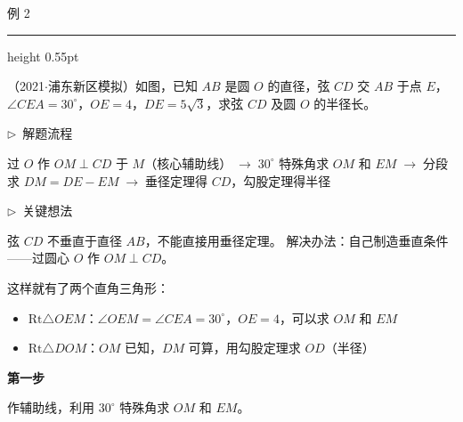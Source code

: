 \documentclass{exam-zh}
\newcommand{\edukai}{\kaishu}
\newenvironment{eduSubQuestionItem}[1]{%
  \needspace{4\baselineskip}%
  \vspace{2mm}
  \par\noindent
  \hangindent=8mm\hangafter=1
  {\color{edu-blue}\bfseries #1}\enspace
  \begingroup
  \color{edu-ink}
}{%
  \endgroup
  \par
  \vspace{3mm}
}
\newenvironment{eduAuxItem}[1]{%
  \needspace{4\baselineskip}%
  \vspace{2mm}
  \par\noindent
  \hangindent=8mm\hangafter=1
  {\color{edu-blue}\edukai $\triangleright$~#1}\enspace
  \begingroup
  \color{edu-ink}
  \edukai
}{%
  \endgroup
  \par
  \vspace{4mm}
}
\newenvironment{eduProblemBlock}[1][题目]{%
  \needspace{8\baselineskip}
  {\small\color{edu-muted}#1}\par
  \vspace{1.5mm}
  {\color{edu-blue}\hrule height 0.55pt}
  \vspace{4.5mm}
  \begingroup
  \color{edu-ink}
  \large
  \setlength{\parskip}{2.2mm}
  \linespread{1.20}\selectfont
}{%
  \par
  \endgroup
  \vspace{6mm}
}
\begin{document}
\begin{eduProblemBlock}[例 2]
（2021$\cdot$浦东新区模拟）如图，已知 $AB$ 是圆 $O$ 的直径，弦 $CD$ 交 $AB$ 于点 $E$，$\angle CEA = 30^\circ$，$OE = 4$，$DE = 5\sqrt{3}$，求弦 $CD$ 及圆 $O$ 的半径长。

\end{eduProblemBlock}









\begin{eduAuxItem}{解题流程}
过 $O$ 作 $OM \perp CD$ 于 $M$（核心辅助线）$\;\to\;$$30^\circ$ 特殊角求 $OM$ 和 $EM$$\;\to\;$分段求 $DM = DE - EM$$\;\to\;$垂径定理得 $CD$，勾股定理得半径\end{eduAuxItem}




\begin{eduAuxItem}{关键想法}
弦 $CD$ 不垂直于直径 $AB$，不能直接用垂径定理。
解决办法：自己制造垂直条件——过圆心 $O$ 作 $OM \perp CD$。

这样就有了两个直角三角形：
\begin{itemize}
  \item $\mathrm{Rt}\triangle OEM$：$\angle OEM = \angle CEA = 30^\circ$，$OE = 4$，可以求 $OM$ 和 $EM$
  \item $\mathrm{Rt}\triangle DOM$：$OM$ 已知，$DM$ 可算，用勾股定理求 $OD$（半径）
\end{itemize}
\end{eduAuxItem}




\begin{eduSubQuestionItem}{第一步}
作辅助线，利用 $30^\circ$ 特殊角求 $OM$ 和 $EM$。\end{eduSubQuestionItem}
\end{document}
